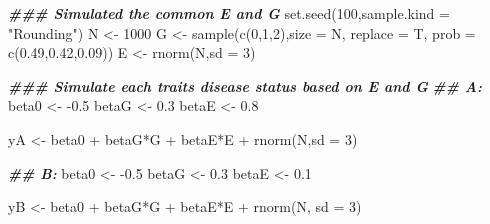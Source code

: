 \documentclass[
]{article}
\newenvironment{Shaded}{\begin{snugshade}}{\end{snugshade}}
\newcommand{\AttributeTok}[1]{\textcolor[rgb]{0.77,0.63,0.00}{#1}}
\newcommand{\DecValTok}[1]{\textcolor[rgb]{0.00,0.00,0.81}{#1}}
\newcommand{\DocumentationTok}[1]{\textcolor[rgb]{0.56,0.35,0.01}{\textbf{\textit{#1}}}}
\newcommand{\FloatTok}[1]{\textcolor[rgb]{0.00,0.00,0.81}{#1}}
\newcommand{\FunctionTok}[1]{\textcolor[rgb]{0.00,0.00,0.00}{#1}}
\newcommand{\NormalTok}[1]{#1}
\newcommand{\OtherTok}[1]{\textcolor[rgb]{0.56,0.35,0.01}{#1}}
\newcommand{\SpecialCharTok}[1]{\textcolor[rgb]{0.00,0.00,0.00}{#1}}
\newcommand{\StringTok}[1]{\textcolor[rgb]{0.31,0.60,0.02}{#1}}
\begin{document}
\begin{Shaded}
\begin{Highlighting}[]
\DocumentationTok{\#\#\# Simulated the common E and G}
\FunctionTok{set.seed}\NormalTok{(}\DecValTok{100}\NormalTok{,}\AttributeTok{sample.kind =} \StringTok{"Rounding"}\NormalTok{)}
\NormalTok{N }\OtherTok{\textless{}{-}} \DecValTok{1000}
\NormalTok{G }\OtherTok{\textless{}{-}} \FunctionTok{sample}\NormalTok{(}\FunctionTok{c}\NormalTok{(}\DecValTok{0}\NormalTok{,}\DecValTok{1}\NormalTok{,}\DecValTok{2}\NormalTok{),}\AttributeTok{size =}\NormalTok{ N, }\AttributeTok{replace =}\NormalTok{ T, }\AttributeTok{prob =} \FunctionTok{c}\NormalTok{(}\FloatTok{0.49}\NormalTok{,}\FloatTok{0.42}\NormalTok{,}\FloatTok{0.09}\NormalTok{))}
\NormalTok{E }\OtherTok{\textless{}{-}} \FunctionTok{rnorm}\NormalTok{(N,}\AttributeTok{sd =} \DecValTok{3}\NormalTok{)}

\DocumentationTok{\#\#\# Simulate each trait\textquotesingle{}s disease status based on E and G}
\DocumentationTok{\#\# A:}
\NormalTok{beta0 }\OtherTok{\textless{}{-}} \SpecialCharTok{{-}}\FloatTok{0.5}
\NormalTok{betaG }\OtherTok{\textless{}{-}} \FloatTok{0.3}
\NormalTok{betaE }\OtherTok{\textless{}{-}} \FloatTok{0.8}

\NormalTok{yA }\OtherTok{\textless{}{-}}\NormalTok{ beta0 }\SpecialCharTok{+}\NormalTok{ betaG}\SpecialCharTok{*}\NormalTok{G }\SpecialCharTok{+}\NormalTok{ betaE}\SpecialCharTok{*}\NormalTok{E }\SpecialCharTok{+} \FunctionTok{rnorm}\NormalTok{(N,}\AttributeTok{sd =} \DecValTok{3}\NormalTok{)}

\DocumentationTok{\#\# B:}
\NormalTok{beta0 }\OtherTok{\textless{}{-}} \SpecialCharTok{{-}}\FloatTok{0.5}
\NormalTok{betaG }\OtherTok{\textless{}{-}} \FloatTok{0.3}
\NormalTok{betaE }\OtherTok{\textless{}{-}} \FloatTok{0.1}

\NormalTok{yB }\OtherTok{\textless{}{-}}\NormalTok{ beta0 }\SpecialCharTok{+}\NormalTok{ betaG}\SpecialCharTok{*}\NormalTok{G }\SpecialCharTok{+}\NormalTok{ betaE}\SpecialCharTok{*}\NormalTok{E }\SpecialCharTok{+} \FunctionTok{rnorm}\NormalTok{(N, }\AttributeTok{sd =} \DecValTok{3}\NormalTok{)}


\end{Highlighting}
\end{Shaded}
\end{document}
